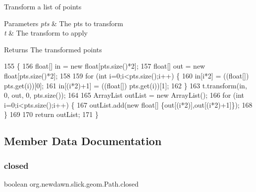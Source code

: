 Transform a list of points


\begin{DoxyParams}{Parameters}
{\em pts} & The pts to transform \\
\hline
{\em t} & The transform to apply \\
\hline
\end{DoxyParams}
\begin{DoxyReturn}{Returns}
The transformed points 
\end{DoxyReturn}

\begin{DoxyCode}
155                                                             \{
156         \textcolor{keywordtype}{float}[] in = \textcolor{keyword}{new} \textcolor{keywordtype}{float}[pts.size()*2];
157         \textcolor{keywordtype}{float}[] out = \textcolor{keyword}{new} \textcolor{keywordtype}{float}[pts.size()*2];
158     
159         \textcolor{keywordflow}{for} (\textcolor{keywordtype}{int} i=0;i<pts.size();i++) \{
160             in[i*2] = ((\textcolor{keywordtype}{float}[]) pts.get(i))[0];
161             in[(i*2)+1] = ((\textcolor{keywordtype}{float}[]) pts.get(i))[1];
162         \}
163         t.transform(in, 0, out, 0, pts.size());
164         
165         ArrayList outList = \textcolor{keyword}{new} ArrayList();
166         \textcolor{keywordflow}{for} (\textcolor{keywordtype}{int} i=0;i<pts.size();i++) \{
167             outList.add(\textcolor{keyword}{new} \textcolor{keywordtype}{float}[] \{out[(i*2)],out[(i*2)+1]\});
168         \}
169         
170         \textcolor{keywordflow}{return} outList;
171     \}
\end{DoxyCode}


\subsection{Member Data Documentation}
\mbox{\label{classorg_1_1newdawn_1_1slick_1_1geom_1_1_path_ad5c0e47e461c78c960f30a7085c45c93}} 
\subsubsection{\texorpdfstring{closed}{closed}}
{\footnotesize\ttfamily boolean org.\+newdawn.\+slick.\+geom.\+Path.\+closed\hspace{0.3cm}{\ttfamily [private]}}

